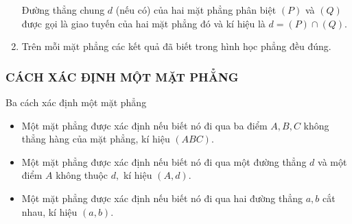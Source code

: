 \begin{enumerate}[\iconMT]
{\begin{tcolorbox}[colframe=\maudl,colback=cyan!3!white,boxrule=0.5mm]
		Đường thẳng chung $d$ (nếu có) của hai mặt phẳng phân biệt $(P)$ và $(Q)$ được gọi là giao tuyến của hai mặt phẳng đó và kí hiệu là $d=(P) \cap(Q)$.
	\end{tcolorbox}}{
}
\item {} Trên mỗi mặt phẳng các kết quả đã biết trong hình học phẳng đều đúng.
\end{enumerate}

\subsubsection{CÁCH XÁC ĐỊNH MỘT MẶT PHẲNG}
Ba cách xác định một mặt phẳng
\begin{tcolorbox}[colframe=\maudl,colback=cyan!3!white,boxrule=0.5mm]
	\begin{itemize}
		\item Một mặt phẳng được xác định nếu biết nó đi qua ba điểm $A,B,C$ không thẳng hàng của mặt phẳng, kí hiệu $\left(ABC\right) $.
		\item Một mặt phẳng được xác định nếu biết nó đi qua một đường thẳng $d$ và một điểm $A$ không thuộc $d,$ kí hiệu $\left(A,d\right) $.
		\item Một mặt phẳng được xác định nếu biết nó đi qua hai đường thẳng $a,b$ cắt nhau, kí hiệu $\left(a,b\right) $.
	\end{itemize}
\end{tcolorbox}
